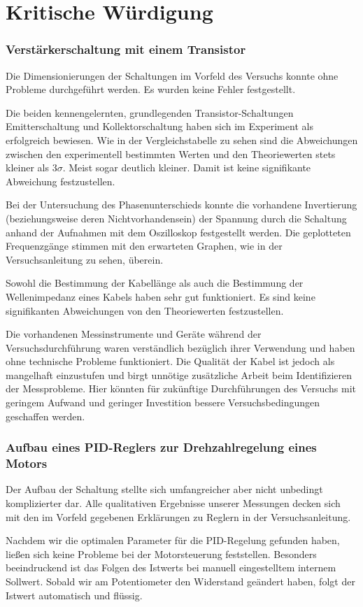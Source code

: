 \section{Kritische Würdigung}
%
\subsubsection*{Verstärkerschaltung mit einem Transistor}
%
Die Dimensionierungen der Schaltungen im Vorfeld des Versuchs konnte ohne Probleme durchgeführt werden.
Es wurden keine Fehler festgestellt.
\par
Die beiden kennengelernten, grundlegenden Transistor-Schaltungen Emitterschaltung und Kollektorschaltung haben sich im Experiment als erfolgreich bewiesen.
Wie in der Vergleichstabelle zu sehen sind die Abweichungen zwischen den experimentell bestimmten Werten und den Theoriewerten stets kleiner als $3 \sigma$.
Meist sogar deutlich kleiner.
Damit ist keine signifikante Abweichung festzustellen.
\par
Bei der Untersuchung des Phasenunterschieds konnte die vorhandene Invertierung (beziehungsweise deren Nichtvorhandensein) der Spannung durch die Schaltung anhand der Aufnahmen mit dem Oszilloskop festgestellt werden.
Die geplotteten Frequenzgänge stimmen mit den erwarteten Graphen, wie in der Versuchsanleitung zu sehen, überein.
\par
Sowohl die Bestimmung der Kabellänge als auch die Bestimmung der Wellenimpedanz eines Kabels haben sehr gut funktioniert.
Es sind keine signifikanten Abweichungen von den Theoriewerten festzustellen.
\par
Die vorhandenen Messinstrumente und Geräte während der Versuchsdurchführung waren verständlich bezüglich ihrer Verwendung und haben ohne technische Probleme funktioniert.
Die Qualität der Kabel ist jedoch als mangelhaft einzustufen und birgt unnötige zusätzliche Arbeit beim Identifizieren der Messprobleme.
Hier könnten für zukünftige Durchführungen des Versuchs mit geringem Aufwand und geringer Investition bessere Versuchsbedingungen geschaffen werden.
%
\subsubsection*{Aufbau eines PID-Reglers zur Drehzahlregelung eines Motors}
%
Der Aufbau der Schaltung stellte sich umfangreicher aber nicht unbedingt komplizierter dar.
Alle qualitativen Ergebnisse unserer Messungen decken sich mit den im Vorfeld gegebenen Erklärungen zu Reglern in der Versuchsanleitung.
\par
Nachdem wir die optimalen Parameter für die PID-Regelung gefunden haben, ließen sich keine Probleme bei der Motorsteuerung feststellen.
Besonders beeindruckend ist das Folgen des Istwerts bei manuell eingestelltem internem Sollwert.
Sobald wir am Potentiometer den Widerstand geändert haben, folgt der Istwert automatisch und flüssig.
%
